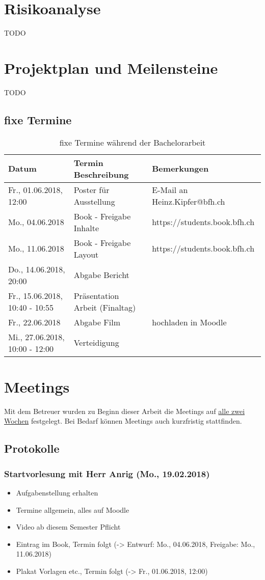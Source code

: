 \section{Risikoanalyse}
TODO

\section{Projektplan und Meilensteine}
TODO

\subsection{fixe Termine}
\begin{table}[H]
	\centering
	\begin{tabular}{lll} \toprule
		\textbf{Datum} 			& \textbf{Termin Beschreibung}		& \textbf{Bemerkungen}		\\ \midrule
		Fr., 01.06.2018, 12:00		& Poster für Ausstellung 		& E-Mail an Heinz.Kipfer@bfh.ch	\\ \midrule
		Mo., 04.06.2018 		& Book - Freigabe Inhalte		& https://students.book.bfh.ch	\\ \midrule
		Mo., 11.06.2018 		& Book - Freigabe Layout		& https://students.book.bfh.ch	\\ \midrule
		Do., 14.06.2018, 20:00		& Abgabe Bericht			&  				\\ \midrule
		Fr., 15.06.2018, 10:40 - 10:55	& Präsentation Arbeit (Finaltag)	&  				\\ \midrule
		Fr., 22.06.2018			& Abgabe Film				& hochladen in Moodle		\\ \midrule
		Mi., 27.06.2018, 10:00 - 12:00	& Verteidigung				&				\\ \bottomrule
	\end{tabular}
	\caption{fixe Termine während der Bachelorarbeit}
	\label{tab:fixeTermine}
\end{table}


\section{Meetings}
Mit dem Betreuer wurden zu Beginn dieser Arbeit die Meetings auf \underline{alle zwei Wochen} festgelegt. Bei Bedarf können Meetings auch kurzfristig stattfinden.
\subsection{Protokolle}
\subsubsection{Startvorlesung mit Herr Anrig (Mo., 19.02.2018)}
\begin{itemize}
	\item Aufgabenstellung erhalten
	\item Termine allgemein, alles auf Moodle
	\item Video ab diesem Semester Pflicht
	\item Eintrag im Book, Termin folgt (-> Entwurf: Mo., 04.06.2018, Freigabe: Mo., 11.06.2018)
	\item Plakat Vorlagen etc., Termin folgt (-> Fr., 01.06.2018, 12:00)
\end{itemize}

